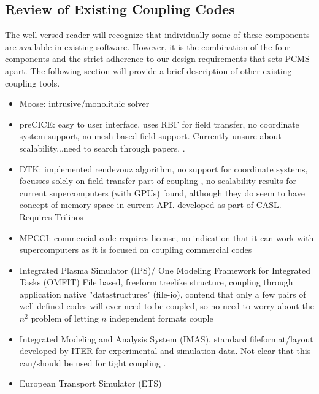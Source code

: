 \documentclass[12pt]{article}
\begin{document}
\subsection{Review of Existing Coupling Codes}
The well versed reader will recognize that individually some of these components are available in existing software. However, it is the combination of the four components and the strict adherence to our design requirements that sets PCMS apart. The following section will provide a brief description of other existing coupling tools.


\begin{itemize}
    \item Moose: intrusive/monolithic solver \cite{gastonMOOSEParallelComputational2009}
    \item preCICE: easy to user interface, uses RBF for field transfer, no coordinate system support, no mesh based field support. Currently unsure about scalability...need to search through papers. \cite{bungartzPlugandplayCouplingApproach2015,bungartzPreCICEFullyParallel2016,chourdakisPreCICEV2Sustainable2022}.
    \item DTK: implemented rendevouz algorithm, no support for coordinate systems, focusses solely on field transfer part of coupling \cite{slatteryDataTransferKit2013}, no scalability results for current supercomputers (with GPUs) found, although they do seem to have concept of memory space in current API. developed as part of CASL. Requires Trilinos
    \item MPCCI: commercial code requires license, no indication that it can work with supercomputers as it is focused on coupling commercial codes \cite{joppichMpCCIToolSimulation2006, mehlParallelCouplingNumerics2016}
    \item Integrated Plasma Simulator (IPS)/ One Modeling Framework for Integrated Tasks (OMFIT) File based, freeform treelike structure, coupling through application native "datastructures" (file-io), contend that only a few pairs of well defined codes will ever need to be coupled, so no need to worry about the \(n^2\) problem of letting \(n\) independent formats couple \cite{foleyIntegratedPlasmaSimulator2011,meneghiniIntegratedModelingApplications2015}
    \item Integrated Modeling and Analysis System (IMAS), standard fileformat/layout developed by ITER for experimental and simulation data. Not clear that this can/should be used for tight coupling \cite{romanelli2020code}.
    \item European Transport Simulator (ETS) \cite{kalupinNumericalAnalysisJET2013, costerBuildingTurbulencetransportWorkflow2021}
\end{itemize}
\end{document}
